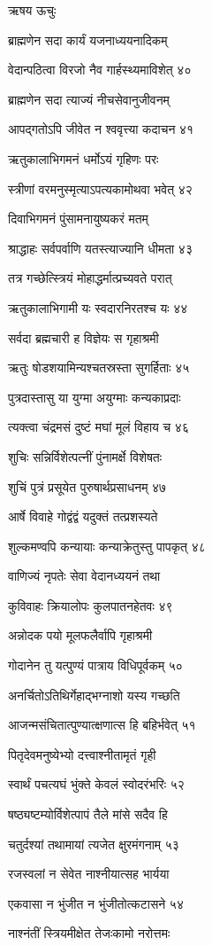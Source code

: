 ऋषय ऊचुः

ब्राह्मणेन सदा कार्यं यजनाध्ययनादिकम्

वेदान्पठित्वा विरजो नैव गार्हस्थ्यमाविशेत् ४०

ब्राह्मणेन सदा त्याज्यं नीचसेवानुजीवनम्

आपद्गतोऽपि जीवेत न श्ववृत्त्या कदाचन ४१

ऋतुकालाभिगमनं धर्मोऽयं गृहिणः परः

स्त्रीणां वरमनुस्मृत्याऽपत्यकामोथवा भवेत् ४२

दिवाभिगमनं पुंसामनायुष्यकरं मतम्

श्राद्धाहः सर्वपर्वाणि यतस्त्याज्यानि धीमता ४३

तत्र गच्छेत्स्त्रियं मोहाद्धर्मात्प्रच्यवते परात्

ऋतुकालाभिगामी यः स्वदारनिरतश्च यः ४४

सर्वदा ब्रह्मचारी ह विज्ञेयः स गृहाश्रमी

ऋतुः षोडशयामिन्यश्चतस्रस्ता सुगर्हिताः ४५

पुत्रदास्तासु या युग्मा अयुग्माः कन्यकाप्रदाः

त्यक्त्वा चंद्रमसं दुष्टं मघां मूलं विहाय च ४६

शुचिः सन्निर्विशेत्पत्नीं पुंनामर्क्षे विशेषतः

शुचिं पुत्रं प्रसूयेत पुरुषार्थप्रसाधनम् ४७

आर्षे विवाहे गोद्वंद्वं यदुक्तं तत्प्रशस्यते

शुल्कमण्वपि कन्यायाः कन्याक्रेतुस्तु पापकृत् ४८

वाणिज्यं नृपतेः सेवा वेदानध्ययनं तथा

कुविवाहः क्रियालोपः कुलपातनहेतवः ४९

अन्नोदक पयो मूलफलैर्वापि गृहाश्रमी

गोदानेन तु यत्पुण्यं पात्राय विधिपूर्वकम् ५०

अनर्चितोऽतिथिर्गेहाद्भग्नाशो यस्य गच्छति

आजन्मसंचितात्पुण्यात्क्षणात्स हि बहिर्भवेत् ५१

पितृदेवमनुष्येभ्यो दत्त्वाश्नीतामृतं गृही

स्वार्थं पचत्यघं भुंक्ते केवलं स्वोदरंभरिः ५२

षष्ठ्यष्टम्योर्विशेत्पापं तैले मांसे सदैव हि

चतुर्दश्यां तथामायां त्यजेत क्षुरमंगनाम् ५३

रजस्वलां न सेवेत नाश्नीयात्सह भार्यया

एकवासा न भुंजीत न भुंजीतोत्कटासने ५४

नाश्नंतीं स्त्रियमीक्षेत तेजःकामो नरोत्तमः

